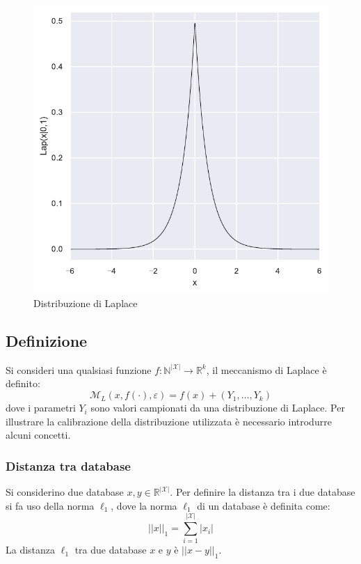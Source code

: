 \begin{figure}[H]
    \centering
    \includegraphics[scale=0.5]{plots/laplace_pdf.pdf}
    \caption{Distribuzione di Laplace}
\end{figure}

\subsection{Definizione}
Si consideri una qualsiasi funzione $f \colon \mathbb{N}^{|\mathcal{X}|} \to \mathbb{R}^k$, il meccanismo di Laplace è definito:
\begin{equation}
\label{eq:laplace_mechanism}
    \mathcal{M}_L(x, f(\cdot), \varepsilon) = f(x) + (Y_1, \dots, Y_k)
\end{equation}
dove i parametri $Y_i$ sono valori campionati da una distribuzione di Laplace. Per illustrare la calibrazione della distribuzione utilizzata è necessario introdurre alcuni concetti.

\subsubsection{Distanza tra database}
Si considerino due database $x, y \in \mathbb{R}^{|\mathcal{X}|}$.
Per definire la distanza tra i due database si fa uso della norma $\ell_1$, dove la norma $\ell_1$ di un database è definita come:
\begin{equation}
\label{eq:l1_norm}
    ||x||_1 = \sum_{i=1}^{|\mathcal{X}|} |x_i|
\end{equation}
La distanza $\ell_1$ tra due database $x$ e $y$ è $||x - y||_1$.


